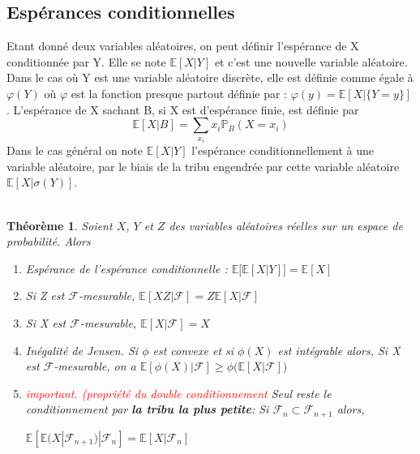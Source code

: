 \documentclass[a4paper]{article}
\newtheorem{theorem}{Théorème}[section]
\begin{document}
\subsection{Espérances conditionnelles}
\label{g}
Etant donné deux variables aléatoires, on peut définir l'espérance de X conditionnée par Y. Elle se note $\mathbb{E}[X|Y]$ et c'est une nouvelle variable aléatoire. Dans le cas où Y est une variable aléatoire discrète, elle est définie comme égale à ${\displaystyle \varphi (Y)}$ où $\varphi$  est la fonction presque partout définie par : ${\displaystyle \varphi (y)=\mathbb{E} [X|\{Y=y\}]}$.
L'espérance de X sachant B, si X est d'espérance finie, est définie par 
\begin{equation}
    \mathbb{E}[X|B]=\sum_{x_i} x_i \mathbb{P}_B (X=x_i)
\end{equation}
Dans le cas général on note $\mathbb{E}[X|Y]$ l'espérance conditionnellement à une variable aléatoire, par le biais de la tribu engendrée par cette variable aléatoire $\mathbb{E}[X|\sigma (Y)]$.\\
\vspace{5mm}\\
\begin{theorem} Soient $X$, $Y$ et $Z$ des variables aléatoires réelles sur un espace de probabilité. Alors \\
\begin{enumerate}[label=\textit{(\roman*)}]
    \item Espérance de l'espérance conditionnelle : $\mathbb{E}\big[\mathbb{E}[X|Y]\big] = \mathbb{E}[X]$
    \item Si Z est $\mathcal{F}$-mesurable, $\mathbb{E}[XZ|\mathcal{F}] = Z\mathbb{E}[X|\mathcal{F}]$
    \item Si X est $\mathcal{F}$-mesurable, $\mathbb{E}[X|\mathcal{F}] = X$
    \item \textit{Inégalité de Jensen}. Si $\phi$ est convexe et si $\phi(X)$ est intégrable alors, Si X est $\mathcal{F}$-mesurable, on a $\mathbb{E}[\phi(X)|\mathcal{F}] \geq \phi\big(\mathbb{E}[X|\mathcal{F}]\big)$
    \item \textcolor{red}{important. (propriété du double conditionnement} Seul reste le conditionnement par \textbf{la tribu la plus petite}: Si $\mathcal{F}_n \subset \mathcal{F}_{n+1}$ alors,
    \begin{center}
        $\mathbb{E}[\mathbb{E}(X|\mathcal{F}_{n+1})|\mathcal{F}_n] = \mathbb{E}[X|\mathcal{F}_n]$
    \end{center}
\end{enumerate}
\end{theorem}
\end{document}
